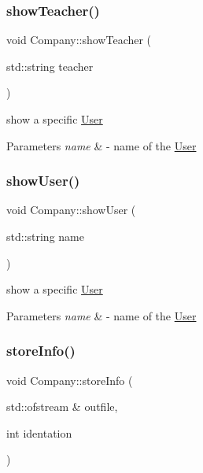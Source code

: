 \subsubsection{\texorpdfstring{show\+Teacher()}{showTeacher()}}
{\footnotesize\ttfamily void Company\+::show\+Teacher (\begin{DoxyParamCaption}\item[{std\+::string}]{teacher }\end{DoxyParamCaption})}



show a specific \mbox{\hyperlink{class_user}{User}} 


\begin{DoxyParams}{Parameters}
{\em name} & -\/ name of the \mbox{\hyperlink{class_user}{User}} \\
\hline
\end{DoxyParams}
\mbox{\label{class_company_a664aa9b9bde35eae3a564edec73cf5b3}} 
\subsubsection{\texorpdfstring{show\+User()}{showUser()}}
{\footnotesize\ttfamily void Company\+::show\+User (\begin{DoxyParamCaption}\item[{std\+::string}]{name }\end{DoxyParamCaption})}



show a specific \mbox{\hyperlink{class_user}{User}} 


\begin{DoxyParams}{Parameters}
{\em name} & -\/ name of the \mbox{\hyperlink{class_user}{User}} \\
\hline
\end{DoxyParams}
\mbox{\label{class_company_ac03f62f1accf21eb445a7aa5731b1199}} 
\subsubsection{\texorpdfstring{store\+Info()}{storeInfo()}}
{\footnotesize\ttfamily void Company\+::store\+Info (\begin{DoxyParamCaption}\item[{std\+::ofstream \&}]{outfile,  }\item[{int}]{identation }\end{DoxyParamCaption})}



